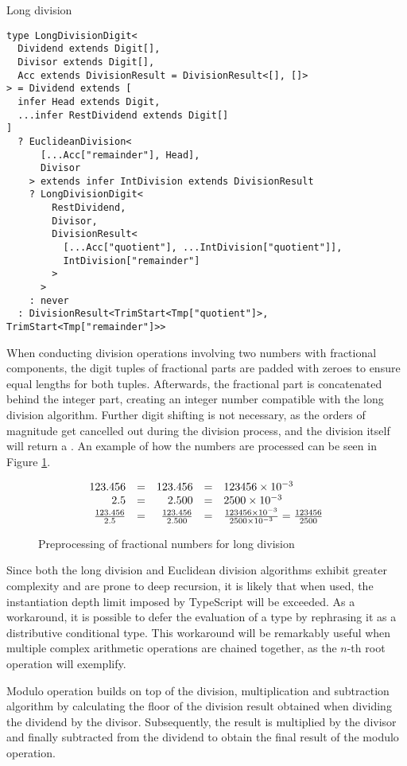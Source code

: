 \begin{listing}[ht]
\caption{Long division}\label{lst:long-division}
\begin{verbatim}
type LongDivisionDigit<
  Dividend extends Digit[],
  Divisor extends Digit[],
  Acc extends DivisionResult = DivisionResult<[], []>
> = Dividend extends [
  infer Head extends Digit,
  ...infer RestDividend extends Digit[]
]
  ? EuclideanDivision<
      [...Acc["remainder"], Head],
      Divisor
    > extends infer IntDivision extends DivisionResult
    ? LongDivisionDigit<
        RestDividend,
        Divisor,
        DivisionResult<
          [...Acc["quotient"], ...IntDivision["quotient"]],
          IntDivision["remainder"]
        >
      >
    : never
  : DivisionResult<TrimStart<Tmp["quotient"]>, TrimStart<Tmp["remainder"]>>
\end{verbatim}
\end{listing}

When conducting division operations involving two numbers with fractional components, the digit tuples of fractional parts are padded with zeroes to ensure equal lengths for both tuples. Afterwards, the fractional part is concatenated behind the integer part, creating an integer number compatible with the long division algorithm. Further digit shifting is not necessary, as the orders of magnitude get cancelled out during the division process, and the division itself will return a . An example of how the numbers are processed can be seen in Figure \ref{fig:long-division-preprocessing}.

\begin{figure}
  \begin{equation*}
    \begin{array}{r@{\quad=\quad}r@{\quad=\quad}l}
      123.456 & 123.456 & 123456 \times 10^{-3} \\
      2.5 & 2.500 & 2500 \times 10^{-3} \\
      \frac{123.456}{2.5} & \frac{123.456}{2.500} & \frac{123456 \times 10^{-3}}{2500 \times 10^{-3}} = \frac{123456}{2500} 
    \end{array}
  \end{equation*}
  \caption{Preprocessing of fractional numbers for long division}\label{fig:long-division-preprocessing}
\end{figure}

Since both the long division and Euclidean division algorithms exhibit greater complexity and are prone to deep recursion, it is likely that when used, the instantiation depth limit imposed by TypeScript will be exceeded. As a workaround, it is possible to defer the evaluation of a type by rephrasing it as a distributive conditional type. This workaround will be remarkably useful when multiple complex arithmetic operations are chained together, as the $n$-th root operation will exemplify.

Modulo operation builds on top of the division, multiplication and subtraction algorithm by calculating the floor of the division result obtained when dividing the dividend by the divisor. Subsequently, the result is multiplied by the divisor and finally subtracted from the dividend to obtain the final result of the modulo operation.